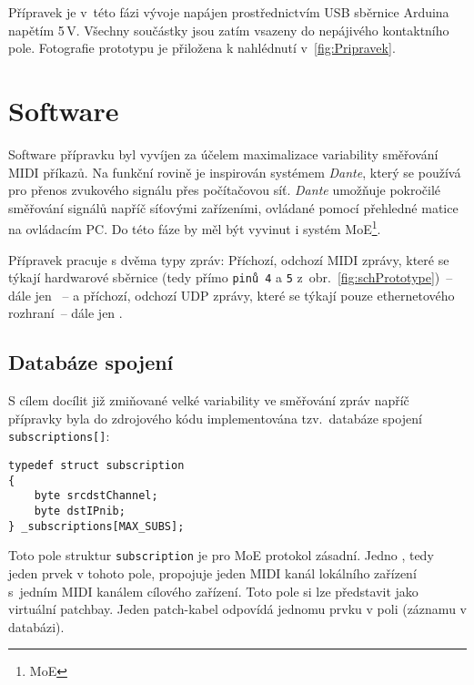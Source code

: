 Přípravek je v~této fázi vývoje napájen prostřednictvím \acs{USB} sběrnice Arduina napětím 5\,\unit{V}. Všechny součástky jsou zatím vsazeny do nepájivého kontaktního pole. Fotografie prototypu je přiložena k nahlédnutí v~\ref{fig:Pripravek}.


\section{Software}
Software přípravku byl vyvíjen za účelem maximalizace variability směřování \acs{MIDI} příkazů. Na funkční rovině je inspirován systémem \emph{Dante}, který se používá pro přenos zvukového signálu přes počítačovou síť. \emph{Dante} umožňuje pokročilé směřování signálů napříč síťovými zařízeními, ovládané pomocí přehledné matice na ovládacím PC. Do této fáze by měl být vyvinut i systém \acs{MoE}\footnote{\acl{MoE}}.

Přípravek pracuje s dvěma typy zpráv: Příchozí, odchozí \acs{MIDI} zprávy, které se týkají hardwarové sběrnice (tedy přímo \texttt{pinů~4} a \texttt{5} z~obr.~\ref{fig:schPrototype})~-- dále jen ~-- a příchozí, odchozí UDP zprávy, které se týkají pouze ethernetového rozhraní~-- dále jen .

\subsection{Databáze spojení}\label{chpt:DatSpoj}
S cílem docílit již zmiňované velké variability ve směřování zpráv napříč přípravky byla do zdrojového kódu implementována tzv.~databáze spojení \texttt{sub\-scrip\-tions[]}:
\begin{lstlisting}
typedef struct subscription
{
    byte srcdstChannel;
    byte dstIPnib;
} _subscriptions[MAX_SUBS];
\end{lstlisting}
Toto pole struktur \texttt{subscription} je pro \acs{MoE} protokol zásadní. Jedno , tedy jeden prvek v tohoto pole, propojuje jeden \acs{MIDI} kanál lokálního zařízení s~jedním \acs{MIDI} kanálem cílového zařízení. Toto pole si lze představit jako virtuální patchbay. Jeden patch-kabel odpovídá jednomu prvku v poli (záznamu v databázi). 

